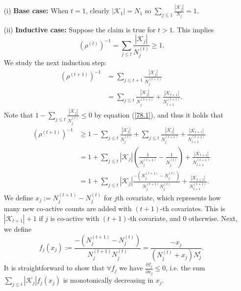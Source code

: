 \documentclass[11pt]{article}
\begin{document}
	\begin{enumerate}
		\item[(i)] \textbf{Base case:} When $t=1$, clearly $|\mathcal{K}_1|=N_1$ so $\sum_{j\leq 1}\frac{|\mathcal{K}_j|}{N_j}= 1$.
		\item[(ii)] \textbf{Inductive case:} Suppose the claim is true for $t>1$. This implies
		\begin{equation}\label{78.1}
			(\rho^{(t)})^{-1}=\sum_{j\leq t}\frac{|\mathcal{K}_j|}{N_j^{(t)}}\geq 1.
		\end{equation}
		We study the next induction step:
		\begin{equation}\label{eqn:indiction}
			\begin{split}
				(\rho^{(t+1)})^{-1}
				&=\sum_{j\leq t+1}\frac{|\mathcal{K}_j|}{N_j^{(t+1)}}\\
				&=\sum_{j\leq t}\frac{|\mathcal{K}_j|}{N_j^{(t+1)}}+
				\frac{|\mathcal{K}_{t+1}|}{N_{t+1}^{(t+1)}}.
			\end{split}    
		\end{equation}
		Note that $1-\sum_{j\leq t}\frac{|\mathcal{K}_j|}{N_j^{(t)}}\leq 0$ by equation (\ref{78.1}), and thus it holds that
		\begin{equation}
			\begin{split}
				(\rho^{(t+1)})^{-1}
				&\geq 1-\sum_{j\leq t}\frac{|\mathcal{K}_j|}{N_j^{(t)}}+\sum_{j\leq t}\frac{|\mathcal{K}_j|}{N_j^{(t+1)}}+
				\frac{|\mathcal{K}_{t+1}|}{N_{t+1}^{(t+1)}}\\
				&=1+\sum_{j\leq t}|\mathcal{K}_j|(\frac{1}{N_j^{(t+1)}}-\frac{1}{N_j^{(t)}})+
				\frac{|\mathcal{K}_{t+1}|}{N_{t+1}^{(t+1)}}\\
				&=1+\sum_{j\leq t}|\mathcal{K}_j|\frac{-(N_j^{(t+1)}-N_j^{(t)})}{N_j^{(t+1)}N_j^{(t)}}+
				\frac{|\mathcal{K}_{t+1}|}{N_{t+1}^{(t+1)}}.
			\end{split}    
		\end{equation}
		We define $x_j:=N_j^{(t+1)}-N_j^{(t)}$ for $j$th covariate, which represents how many new co-active counts are added with $(t+1)$-th covariates. This is $|\mathcal{K}_{t+1}|+1$ if $j$ is co-active with $(t+1)$-th covariate, and 0 otherwise. Next, we define
		\begin{equation}
			f_j(x_j):=\frac{-(N_j^{(t+1)}-N_j^{(t)})}{N_j^{(t+1)}N_j^{(t)}}
			=\frac{-x_j}{(N_j^{(t)}+x_j)N_{j}^{t}}.
		\end{equation}
		It is straightforward to show that $\forall f_j$ we have $\frac{\partial f_j}{\partial x_j}\leq 0$, i.e. the sum $\sum_{j\leq t}|\mathcal{K}_j|f_j(x_j)$ is monotonically decreasing in $x_j$.
		

\end{enumerate}
\end{document}

